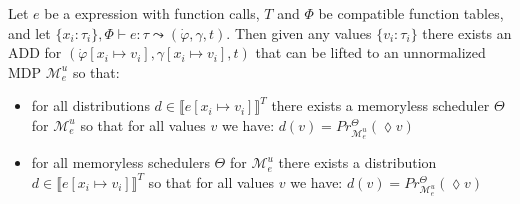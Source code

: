 \begin{lemma}\label{UnnormalizedCorrespondenceFunctions} 
	Let $e$ be a \NDICE expression with function calls, $T$ and $\Phi$ be compatible function tables, and let $\{x_i\colon \tau_i\}, \Phi \vdash e \colon \tau \leadsto (\dot{\varphi}, \gamma, t)$. 
	Then given any values $\{v_i\colon \tau_i\}$ there exists an ADD for $(\dot{\varphi}[x_i\mapsto v_i], \gamma[x_i\mapsto v_i], t)$ that can be lifted to an unnormalized MDP $\mathcal{M}^u_e$ so that:
	\begin{itemize}
		\item for all distributions $d \in \llbracket e[x_i\mapsto v_i] \rrbracket^T$ there exists a memoryless scheduler $\Theta$ for $\mathcal{M}^u_e$ so that for all values $v$ we have: $d(v) = Pr^\Theta_{\mathcal{M}^u_e}(\lozenge v)$
		\item for all memoryless schedulers $\Theta$ for $\mathcal{M}^u_e$ there exists a distribution $d \in \llbracket e[x_i\mapsto v_i] \rrbracket^T$ so that for all values $v$ we have: $d(v) = Pr^\Theta_{\mathcal{M}^u_e}(\lozenge v)$
	\end{itemize} 
\end{lemma}
